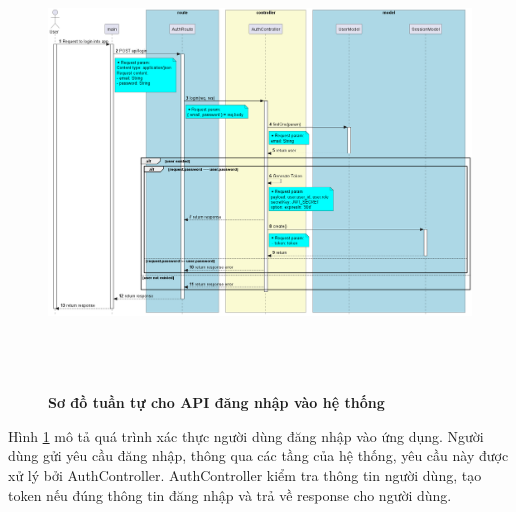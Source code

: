 \begin{figure}[H]
  \centering
  \includegraphics[width=16cm,height=12cm]{Images/server/sequence/server/login.png}
  \caption[Sơ đồ tuần tự cho API đăng nhập vào hệ thống]{\bfseries \fontsize{12pt}{0pt}
  \selectfont Sơ đồ tuần tự cho API đăng nhập vào hệ thống }
  \label{backend_login} %
\end{figure}
Hình \ref{backend_login}  mô tả quá trình xác thực người dùng đăng nhập vào ứng dụng. Người dùng gửi yêu cầu đăng nhập, thông qua các tầng của hệ thống, yêu cầu này được xử lý bởi AuthController. AuthController kiểm tra thông tin người dùng, tạo token nếu đúng thông tin đăng nhập và trả về response cho người dùng.

